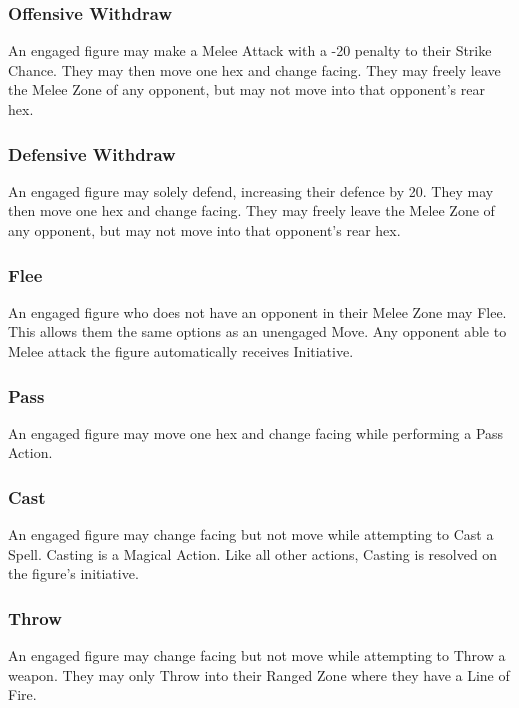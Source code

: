 \begin{multicols*}{3}
\subsubsection{Offensive Withdraw}

An engaged figure may make a Melee Attack with a -20 penalty to their
Strike Chance. They may then move one hex and change facing. They may
freely leave the Melee Zone of any opponent, but may not move into
that opponent's rear hex.

\subsubsection{Defensive Withdraw}

An engaged figure may solely defend, increasing their defence by
20. They may then move one hex and change facing. They may freely
leave the Melee Zone of any opponent, but may not move into that
opponent's rear hex.

\subsubsection{Flee}

An engaged figure who does not have an opponent in their Melee Zone
may Flee. This allows them the same options as an unengaged Move. Any
opponent able to Melee attack the figure automatically receives
Initiative.

\subsubsection{Pass}

An engaged figure may move one hex and change facing while performing
a Pass Action.

\subsubsection{Cast}

An engaged figure may change facing but not move while attempting to
Cast a Spell. Casting is a Magical Action. Like all other actions,
Casting is resolved on the figure's initiative.

\subsubsection{Throw}

An engaged figure may change facing but not move while attempting to
Throw a weapon. They may only Throw into their Ranged Zone where they
have a Line of Fire.


\end{multicols*}
